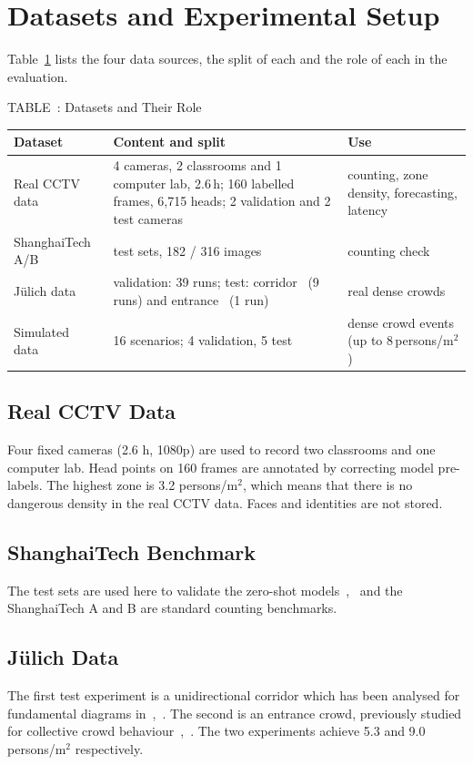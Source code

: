 \documentclass[conference]{IEEEtran}
\newcommand{\pmsq}{persons/m$^2$}
\newcommand{\CStabcap}[2]{\refstepcounter{table}\label{#2}{\centering\footnotesize TABLE~\thetable: #1\par}\vspace{4pt}}
\begin{document}
\section{Datasets and Experimental Setup}
Table~\ref{tab:data} lists the four data sources, the split of each and the role of each in the evaluation.

\begin{table}[!t]
\CStabcap{Datasets and Their Role}{tab:data}
\centering
\scriptsize
\setlength{\tabcolsep}{3pt}
\begin{tabular}{@{}p{1.45cm}p{3.65cm}p{2.7cm}@{}}
\toprule
Dataset & Content and split & Use \\
\midrule
Real CCTV data & 4 cameras, 2 classrooms and 1 computer lab, 2.6\,h; 160 labelled frames, 6,715 heads; 2 validation and 2 test cameras & counting, zone density, forecasting, latency \\
ShanghaiTech A/B~\cite{zhang2016mcnn} & test sets, 182 / 316 images & counting check \\
J\"ulich data~\cite{julich_archive} & validation: 39 runs; test: corridor~\cite{julich_uni2013} (9 runs) and entrance~\cite{julich_semicircle} (1 run) & real dense crowds \\
Simulated data~\cite{jupedsim} & 16 scenarios; 4 validation, 5 test & dense crowd events (up to 8\,\pmsq) \\
\bottomrule
\end{tabular}
\end{table}

\subsection{Real CCTV Data}
Four fixed cameras (2.6 h, 1080p) are used to record two classrooms and one computer lab. Head points on 160 frames are annotated by correcting model pre-labels. The highest zone is 3.2 \pmsq{}, which means that there is no dangerous density in the real CCTV data. Faces and identities are not stored.

\subsection{ShanghaiTech Benchmark}
The test sets are used here to validate the zero-shot models~\cite{zhang2016mcnn},~\cite{li2018csrnet} and the ShanghaiTech A and B are standard counting benchmarks.

\subsection{J\"ulich Data}
The first test experiment is a unidirectional corridor which has been analysed for fundamental diagrams in~\cite{julich_uni2013},~\cite{cao2017fundamental}. The second is an entrance crowd, previously studied for collective crowd behaviour~\cite{julich_semicircle},~\cite{sieben2017collective}. The two experiments achieve 5.3 and 9.0 \pmsq{} respectively.
\end{document}
